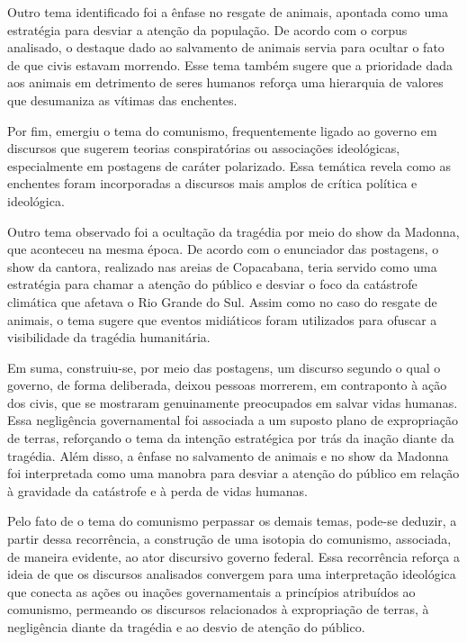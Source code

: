 \documentclass[portuguese]{textolivre}
\begin{document}
Outro tema identificado foi a ênfase no resgate de animais, apontada como uma estratégia para desviar a atenção da população. De acordo com o corpus analisado, o destaque dado ao salvamento de animais servia para ocultar o fato de que civis estavam morrendo. Esse tema também sugere que a prioridade dada aos animais em detrimento de seres humanos reforça uma hierarquia de valores que desumaniza as vítimas das enchentes. 

Por fim, emergiu o tema do comunismo, frequentemente ligado ao governo em discursos que sugerem teorias conspiratórias ou associações ideológicas, especialmente em postagens de caráter polarizado. Essa temática revela como as enchentes foram incorporadas a discursos mais amplos de crítica política e ideológica. 

Outro tema observado foi a ocultação da tragédia por meio do show da Madonna, que aconteceu na mesma época. De acordo com o enunciador das postagens, o show da cantora, realizado nas areias de Copacabana, teria servido como uma estratégia para chamar a atenção do público e desviar o foco da catástrofe climática que afetava o Rio Grande do Sul. Assim como no caso do resgate de animais, o tema sugere que eventos midiáticos foram utilizados para ofuscar a visibilidade da tragédia humanitária.

Em suma, construiu-se, por meio das postagens, um discurso segundo o qual o governo, de forma deliberada, deixou pessoas morrerem, em contraponto à ação dos civis, que se mostraram genuinamente preocupados em salvar vidas humanas. Essa negligência governamental foi associada a um suposto plano de expropriação de terras, reforçando o tema da intenção estratégica por trás da inação diante da tragédia. Além disso, a ênfase no salvamento de animais e no show da Madonna foi interpretada como uma manobra para desviar a atenção do público em relação à gravidade da catástrofe e à perda de vidas humanas.

Pelo fato de o tema do comunismo perpassar os demais temas, pode-se deduzir, a partir dessa recorrência, a construção de uma isotopia do comunismo, associada, de maneira evidente, ao ator discursivo governo federal. Essa recorrência reforça a ideia de que os discursos analisados convergem para uma interpretação ideológica que conecta as ações ou inações governamentais a princípios atribuídos ao comunismo, permeando os discursos relacionados à expropriação de terras, à negligência diante da tragédia e ao desvio de atenção do público.
\end{document}
